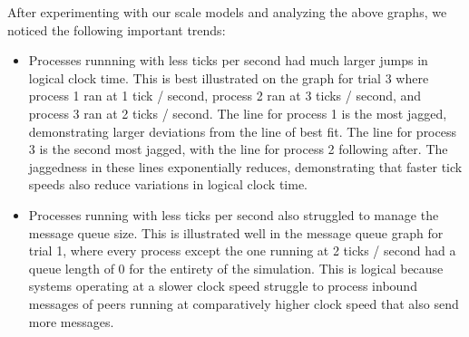 \documentclass[
	a4paper, %
	10pt, %
	unnumberedsections, %
	twoside, %
]{LTJournalArticle}
\begin{document}
\vspace{1mm}

After experimenting with our scale models and analyzing the above graphs, we noticed the following important trends: 
\begin{itemize}
    \item Processes runnning with less ticks per second had much larger jumps in logical clock time. This is best illustrated on the graph for trial 3 where process 1 ran at 1 tick / second, process 2 ran at 3 ticks / second, and process 3 ran at 2 ticks / second. The line for process 1 is the most jagged, demonstrating larger deviations  from the line of best fit. The line for process 3 is the second most jagged, with the line for process 2 following after. The jaggedness in these lines exponentially reduces, demonstrating that faster tick speeds also reduce variations in logical clock time. 
    \item Processes running with less ticks per second also struggled to manage the message queue size. This is illustrated well in the message queue graph for trial 1, where every process except the one running at 2 ticks / second had a queue length of 0 for the entirety of the simulation. This is logical because systems operating at a slower clock speed struggle to process inbound messages of peers running at comparatively higher clock speed that also send more messages.
\end{itemize}







\end{document}
